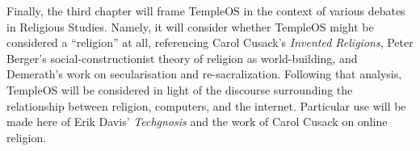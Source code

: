 \documentclass[Draft.tex]{subfiles}
\begin{document}
Finally, the third chapter will frame TempleOS in the context of various
debates in Religious Studies.
Namely, it will consider whether TempleOS might be considered a ``religion''
at all, referencing Carol Cusack's \textit{Invented Religions},
Peter Berger's social-constructionist theory of religion as world-building,
and Demerath's work on secularisation and re-sacralization.
Following that analysis, TempleOS will be considered in light of the discourse
surrounding the relationship between religion, computers, and the internet.
Particular use will be made here of Erik Davis' \textit{Techgnosis} and
the work of Carol Cusack on online religion.
\end{document}
